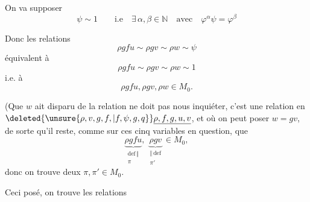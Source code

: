 
On va supposer
\[
\boxed{\psi\sim1\qquad\text{i.e}\quad\exists\,\alpha,\beta\in\mathbb N}\quad\text{avec}\quad\boxed{\varphi^\alpha\psi=\varphi^\beta}
\]

Donc les relations
\[
\rho gfu\sim\rho gv\sim\rho w\sim\psi
\]
équivalent à
\[
\rho gfu\sim\rho gv\sim\rho w\sim1
\]
i.e. à
\[
\boxed{\rho gfu,\rho gv,\rho w\in M_0.}
\]

(Que $w$ ait disparu de la relation   ne doit pas nous inquiéter, c'est une relation en $\deleted{\unsure{\rho,v,g,f,|f,\psi,g,q}}\underline{\rho,f,g,u,v}$, et où on peut poser $w=gv$, de sorte qu'il  reste, comme  sur ces cinq variables en question, que
\[
\underbrace{\rho gfu}_{\substack{\mathrm{def}\,\Vert\\\pi}},\ \underbrace{\rho gv}_{\substack{\Vert\,\mathrm{def}\\\pi'}}\in M_0,
\]
donc on trouve deux  $\pi,\pi'\in M_0$.

Ceci posé, on trouve les relations

